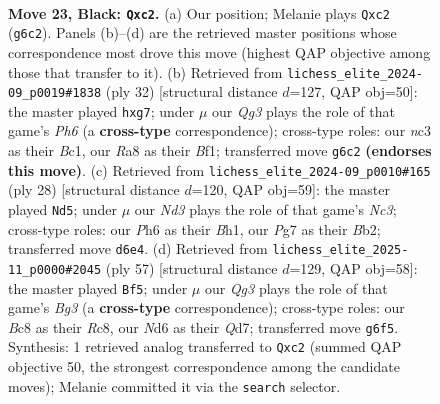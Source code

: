 \documentclass[11pt]{article}
\begin{document}
\begin{figure}[p]
\label{fig:thought-m43}
\end{figure}

\clearpage

\begin{figure}[p]\centering
\begin{subfigure}{0.46\textwidth}\centering
\resizebox{\linewidth}{!}{%
\newchessgame
\chessboard[
  setfen={r1b3k1/ppppQpp1/1b1n2qp/3P4/6B1/2N2P1P/PPP3P1/R1B2K2 b - - 2 23},
  showmover=false,
  pgfstyle=straightmove, color=movearrow, markmove={g6-c2}
]}
\caption{}
\end{subfigure}\hfill
\begin{subfigure}{0.46\textwidth}\centering
\resizebox{\linewidth}{!}{%
\newchessgame
\chessboard[
  setfen={r3k2r/pbpp1ppp/1p5P/1Qb5/2P1P1q1/2N5/PPK1P1P1/R1B2B1n w kq - 3 17},
  showmover=false,
  pgfstyle=straightmove, color=movearrow, markmove={h6-g7}
]}
\caption{}
\end{subfigure}
\\[4pt]
\begin{subfigure}{0.46\textwidth}\centering
\resizebox{\linewidth}{!}{%
\newchessgame
\chessboard[
  setfen={r3kb2/pp3ppn/n1p1p1b1/6P1/2Pq4/1PNP4/PB1QPP2/R3K2B w Qq - 0 15},
  showmover=false,
  pgfstyle=straightmove, color=movearrow, markmove={c3-d5}
]}
\caption{}
\end{subfigure}\hfill
\begin{subfigure}{0.46\textwidth}\centering
\resizebox{\linewidth}{!}{%
\newchessgame
\chessboard[
  setfen={2r3k1/3q1pp1/1pp3bp/3pB1b1/1N1Pn1Q1/2PB3P/1P3PP1/R5K1 b - - 3 29},
  showmover=false,
  pgfstyle=straightmove, color=movearrow, markmove={g6-f5}
]}
\caption{}
\end{subfigure}
\caption{\textbf{Move 23, Black: \texttt{Qxc2}.} (a) Our position; Melanie plays \texttt{Qxc2} (\texttt{g6c2}). Panels (b)--(d) are the retrieved master positions whose correspondence most drove this move (highest QAP objective among those that transfer to it). (b) Retrieved from \texttt{lichess\_elite\_2024-09\_p0019\#1838} (ply 32) [structural distance $d$=127, QAP obj=50]: the master played \texttt{hxg7}; under $\mu$ our \emph{Qg3} plays the role of that game's \emph{Ph6} (a \textbf{cross-type} correspondence); cross-type roles: our \emph{n}c3 as their \emph{B}c1, our \emph{R}a8 as their \emph{B}f1; transferred move \texttt{g6c2} \textbf{(endorses this move)}. (c) Retrieved from \texttt{lichess\_elite\_2024-09\_p0010\#165} (ply 28) [structural distance $d$=120, QAP obj=59]: the master played \texttt{Nd5}; under $\mu$ our \emph{Nd3} plays the role of that game's \emph{Nc3}; cross-type roles: our \emph{P}h6 as their \emph{B}h1, our \emph{P}g7 as their \emph{B}b2; transferred move \texttt{d6e4}. (d) Retrieved from \texttt{lichess\_elite\_2025-11\_p0000\#2045} (ply 57) [structural distance $d$=129, QAP obj=58]: the master played \texttt{Bf5}; under $\mu$ our \emph{Qg3} plays the role of that game's \emph{Bg3} (a \textbf{cross-type} correspondence); cross-type roles: our \emph{B}c8 as their \emph{R}c8, our \emph{N}d6 as their \emph{Q}d7; transferred move \texttt{g6f5}. Synthesis: 1 retrieved analog transferred to \texttt{Qxc2} (summed QAP objective 50, the strongest correspondence among the candidate moves); Melanie committed it via the \texttt{search} selector.}

\end{figure}
\end{document}
